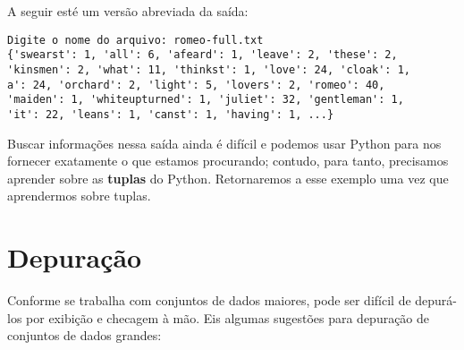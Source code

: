 A seguir esté um versão abreviada da saída:

\beforeverb
\begin{verbatim}
Digite o nome do arquivo: romeo-full.txt
{'swearst': 1, 'all': 6, 'afeard': 1, 'leave': 2, 'these': 2,
'kinsmen': 2, 'what': 11, 'thinkst': 1, 'love': 24, 'cloak': 1,
a': 24, 'orchard': 2, 'light': 5, 'lovers': 2, 'romeo': 40,
'maiden': 1, 'whiteupturned': 1, 'juliet': 32, 'gentleman': 1,
'it': 22, 'leans': 1, 'canst': 1, 'having': 1, ...}
\end{verbatim}
\afterverb
%
Buscar informações nessa saída ainda é difícil e podemos usar Python para nos fornecer exatamente o que estamos procurando; contudo, para tanto, precisamos aprender sobre as {\bf tuplas} do Python. Retornaremos a esse exemplo uma vez que aprendermos sobre tuplas.

\section{Depuração}

Conforme se trabalha com conjuntos de dados maiores, pode ser difícil de depurá-los por exibição e checagem à mão. Eis algumas sugestões para depuração de conjuntos de dados grandes:

